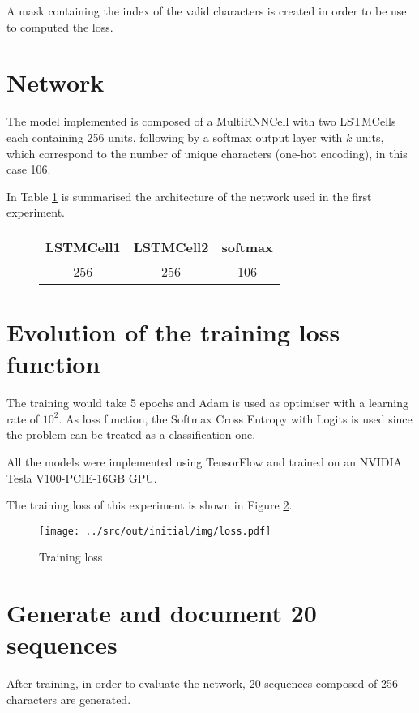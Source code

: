\documentclass[a4paper,12pt]{article} %
\begin{document}
	A mask containing the index of the valid characters is created in order to 
	be use to computed the loss.
	
	\section{Network}
	\label{section:network}
	
	The model implemented is composed of a MultiRNNCell with two LSTMCells each 
	containing 256 units, following by a softmax output layer with $k$ units, 
	which correspond to the number of unique characters (one-hot encoding), in 
	this case 106.
	
	In Table \ref{tab:model0} is summarised the architecture of the network 
	used in the first experiment.	
	\begin{figure}[htb]
		\centering
		
		\begin{tabular}{ccc}
			\toprule
			\textbf{LSTMCell1} & \textbf{LSTMCell2} & \textbf{softmax} \\
			\midrule
			256 & 256 & 106\\
			\bottomrule
		\end{tabular}
		\label{tab:model0}
	\end{figure}

	\section{Evolution of the training loss function}
	\label{section:loss}

	The training would take 5 epochs and Adam is used as optimiser with a 
	learning rate of $10^2$. As loss function, the Softmax Cross Entropy with 
	Logits is used since the problem can be treated as a classification one.
	
	All the models were implemented using TensorFlow and trained on an NVIDIA 
	Tesla V100-PCIE-16GB GPU.
	
	The training loss of this experiment is shown in Figure 
	\ref{fig:model0-loss}.
	
	\begin{figure}[htb]
		\centering
		\texttt{[image: ../src/out/initial/img/loss.pdf]}	
		\caption{Training loss}
		\label{fig:model0-loss}
	\end{figure}

	\section{Generate and document 20 sequences}
	After training, in order to evaluate the network, 20 sequences composed of 
	256 characters are generated.\bigskip
	
\end{document}
